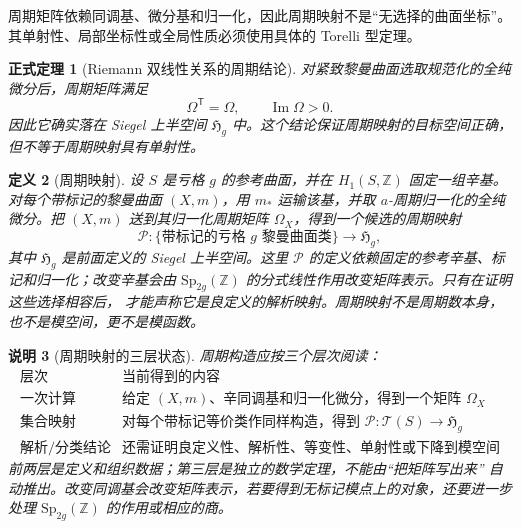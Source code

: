 \documentclass[UTF8,fontset=none,a4paper,11pt]{ctexart}
\theoremstyle{foundation-definition}
\newtheorem{definition}{定义}[section]
\theoremstyle{foundation-theorem}
\newtheorem{theorem}[definition]{正式定理}
\theoremstyle{foundation-proposition}
\theoremstyle{foundation-example}
\theoremstyle{foundation-remark}
\newtheorem{remark}[definition]{说明}
\theoremstyle{foundation-theorem}
\newcommand{\T}{\mathcal T}
\begin{document}
周期矩阵依赖同调基、微分基和归一化，因此周期映射不是“无选择的曲面坐标”。其单射性、局部坐标性或全局性质必须使用具体的 Torelli 型定理。

\begin{theorem}[Riemann 双线性关系的周期结论]\label{thm:riemann-bilinear-period-consequence}
对紧致黎曼曲面选取规范化的全纯微分后，周期矩阵满足
\[
\Omega^{\mathsf T}=\Omega,\qquad \operatorname{Im}\Omega>0.
\]
因此它确实落在 Siegel 上半空间 \(\mathfrak H_g\) 中。这个结论保证周期映射的目标空间正确，但不等于周期映射具有单射性。
\end{theorem}

\begin{definition}[周期映射]\label{def:period-map}
设 \(S\) 是亏格 \(g\) 的参考曲面，并在 \(H_1(S,\mathbb Z)\) 固定一组辛基。对每个带标记的黎曼曲面 \((X,m)\)，用 \(m_*\) 运输该基，并取 \(a\)-周期归一化的全纯微分。把 \((X,m)\) 送到其归一化周期矩阵 \(\Omega_X\)，得到一个候选的周期映射
\[
\mathcal P:\{\text{带标记的亏格 }g\text{ 黎曼曲面类}\}
\longrightarrow\mathfrak H_g,
\]
其中 \(\mathfrak H_g\) 是前面定义的 Siegel 上半空间。这里 \(\mathcal P\) 的定义依赖固定的参考辛基、标记和归一化；改变辛基会由
\(\mathrm{Sp}_{2g}(\mathbb Z)\) 的分式线性作用改变矩阵表示。只有在证明这些选择相容后，
才能声称它是良定义的解析映射。周期映射不是周期数本身，也不是模空间，更不是模函数。
\end{definition}

\begin{remark}[周期映射的三层状态]\label{rem:period-map-status}
周期构造应按三个层次阅读：
\[
\begin{array}{c|l}
\text{层次}&\text{当前得到的内容}\\
\hline
\text{一次计算}&\text{给定 }(X,m)\text{、辛同调基和归一化微分，得到一个矩阵 }\Omega_X\\
\text{集合映射}&\text{对每个带标记等价类作同样构造，得到 }\mathcal P:\T(S)\to\mathfrak H_g\\
\text{解析/分类结论}&\text{还需证明良定义性、解析性、等变性、单射性或下降到模空间}
\end{array}
\]
前两层是定义和组织数据；第三层是独立的数学定理，不能由“把矩阵写出来”
自动推出。改变同调基会改变矩阵表示，若要得到无标记模点上的对象，还要进一步
处理 \(\mathrm{Sp}_{2g}(\mathbb Z)\) 的作用或相应的商。
\end{remark}
\end{document}

